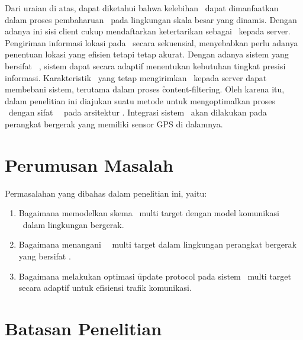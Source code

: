 Dari uraian di atas, dapat diketahui bahwa kelebihan \pubsub~dapat dimanfaatkan
dalam proses pembaharuan \tracking~pada lingkungan skala besar yang dinamis.
Dengan adanya ini sisi client cukup mendaftarkan ketertarikan sebagai
\event~kepada server. Pengiriman informasi lokasi pada \tracking~secara
sekuensial, menyebabkan perlu adanya penentuan lokasi yang efisien tetapi tetap
akurat. Dengan adanya sistem yang bersifat \context~\aware, sistem dapat secara
adaptif menentukan kebutuhan tingkat presisi informasi. Karakteristik
\publisher~yang tetap mengirimkan \event~kepada server dapat membebani sistem,
terutama dalam proses \f{content-filtering}. Oleh karena itu, dalam penelitian
ini diajukan suatu metode untuk mengoptimalkan proses \tracking~dengan sifat
\context~\aware~pada arsitektur \pubsub.  Integrasi sistem \tracking~akan
dilakukan pada perangkat bergerak yang memiliki sensor GPS di dalamnya.


\section{Perumusan Masalah}

Permasalahan yang dibahas dalam penelitian ini, yaitu:
\begin{enumerate}
    \item Bagaimana memodelkan skema \tracking~multi target dengan model komunikasi
        \pubsub~dalam lingkungan bergerak.
    \item Bagaimana menangani \query~\tracking~multi target dalam lingkungan
        perangkat bergerak yang bersifat \unreliable.
    \item Bagaimana melakukan optimasi \f{update protocol} pada sistem
        \tracking~multi target secara adaptif untuk efisiensi trafik komunikasi.
\end{enumerate}


\section{Batasan Penelitian}

